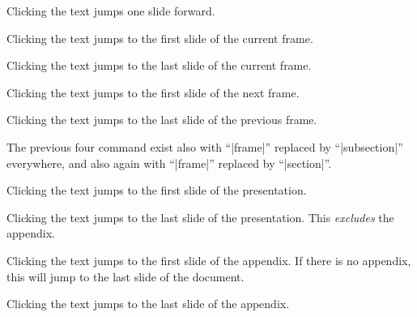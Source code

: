 \begin{command}{\hyperlinkslidenext{}}
  Clicking the text jumps one slide forward.
\end{command}
  
\begin{command}{\hyperlinkframestart{}}
  Clicking the text jumps to the first slide of the current frame.
\end{command}

\begin{command}{\hyperlinkframeend{}}
  Clicking the text jumps to the last slide of the current frame.
\end{command}

\begin{command}{\hyperlinkframestartnext{}}
  Clicking the text jumps to the first slide of the next frame.
\end{command}

\begin{command}{\hyperlinkframeendprev{}}
  Clicking the text jumps to the last slide of the previous frame.
\end{command}

The previous four command exist also with ``|frame|'' replaced by
``|subsection|'' everywhere, and also again with  ``|frame|'' replaced
by ``|section|''.

\begin{command}{\hyperlinkpresentationstart{}}
  Clicking the text jumps to the first slide of the presentation.
\end{command}

\begin{command}{\hyperlinkpresentationend{}}
  Clicking the text jumps to the last slide of the presentation. This
  \emph{excludes} the appendix.
\end{command}

\begin{command}{\hyperlinkappendixstart{}}
  Clicking the text jumps to the first slide of the appendix. If there
  is no appendix, this will jump to the last slide of the document.
\end{command}

\begin{command}{\hyperlinkappendixend{}}
  Clicking the text jumps to the last slide of the appendix.
\end{command}

